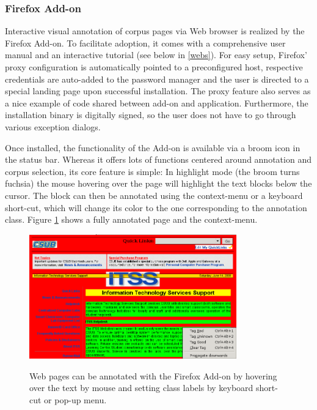 \subsubsection{Firefox Add-on}

Interactive visual annotation of corpus pages via Web browser is realized by the {\KrdWrd} Firefox Add-on.
To facilitate adoption, it comes with a comprehensive user manual and an interactive tutorial (see below in \ref{webs}).
For easy setup, Firefox' proxy configuration is automatically pointed to a preconfigured host, respective credentials are auto-added to the password manager and the user is directed to a special landing page upon successful installation.
The proxy feature also serves as a nice example of code shared between add-on and application.
Furthermore, the installation binary is digitally signed, so the user does not have to go through various exception dialogs.


Once installed, the functionality of the Add-on is available via a broom icon in the status bar.
Whereas it offers lots of functions centered around annotation and corpus selection, its core feature is simple:
In highlight mode (the broom turns fuchsia) the mouse hovering over the page will highlight the text blocks below the cursor.
The block can then be annotated using the context-menu or a keyboard short-cut, which will change its color to the one corresponding to the annotation class.
Figure \ref{f:tut0} shows a fully annotated page and the context-menu.

\begin{figure}
	{\includegraphics[width=0.8\textwidth]{tut0}}
\caption{\label{f:tut0}Web pages can be annotated with the {\KrdWrd} Firefox Add-on by hovering over the text by mouse and setting class labels by keyboard short-cut or pop-up menu.}
\end{figure}


